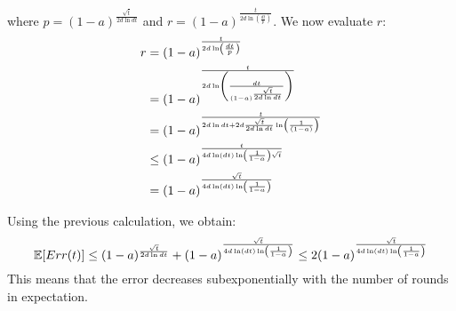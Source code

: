 where $p = (1-a)^{\frac{\sqrt{t}}{2d\ln dt}}$ and $r = (1-a)^{\frac{t}{2d\ln( \frac{dt}{p})} }$. 
We now evaluate $r$:
\begin{align*}
r 
&= (1-a)^{\frac{t}{2d\ln\left( \frac{dt}{p}\right)} }\\
&= (1-a)^{\frac{t}{2d\ln\left( \frac{dt}{(1-a)^{\frac{\sqrt{t}}{2d\ln dt}}}\right)} }\\
&= (1-a)^{\frac{t}{2d\ln dt + 2d\frac{\sqrt{t}}{2d\ln dt}\ln\left( \frac{1}{(1-a)}\right) }}\\
&\leq (1-a)^{\frac{t}{4d\ln(dt)\ln\left( \frac{1}{1-a}\right) \sqrt{t}}}\\
&= (1-a)^{\frac{\sqrt{t}}{4d\ln(dt)\ln\left( \frac{1}{1-a}\right)}}
\end{align*}

Using the previous calculation, we obtain:
$$ \mathbb{E}[Err(t)] \leq (1-a)^{\frac{\sqrt{t}}{2d\ln dt}} + (1-a)^{\frac{\sqrt{t}}{4d\ln(dt)\ln\left( \frac{1}{1-a}\right)}} \leq 2(1-a)^{\frac{\sqrt{t}}{4d\ln(dt)\ln\left( \frac{1}{1-a}\right)}}$$
This means that the error decreases subexponentially with the number of rounds in expectation. 

